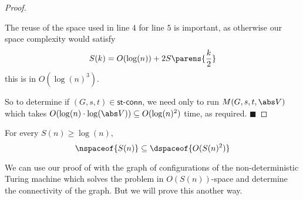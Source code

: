 \documentclass[10pt]{article}
\def\stconn{\textsf{st-conn}}
\def\qed{%
    \ifmmode%
        \eqno\blacksquare%
    \else%
        \hskip1cm\allowbreak\hbox{}\nobreak\hfill$\blacksquare$%
    \fi%
}
\begin{document}
\begin{proof}
    \begin{note}
        The reuse of the space used in line $4$ for line $5$ is important, as otherwise our space complexity would satisfy
        \[ S(k) = O(\log(n)) + 2S\parens{\frac k2} \]
        this is in $O(\log(n)^3)$.
    \end{note}

    So to determine if $(G,s,t)\in\stconn$, we need only to run $M(G,s,t,\abs V)$ which takes $O(\log(n)\cdot\log(\abs V))\subseteq O(\log(n)^2)$ time, as required.
    \qed

\end{proof}

\begin{thrm*}

    For every $S(n)\geq\log(n)$,
    \[ \nspaceof{S(n)} \subseteq \dspaceof{O(S(n)^2)} \]

\end{thrm*}

We can use our proof of  with the graph of configurations of the non-deterministic Turing machine which solves the problem in $O(S(n))$-space and determine the connectivity of the
graph.
But we will prove this another way.
\end{document}
